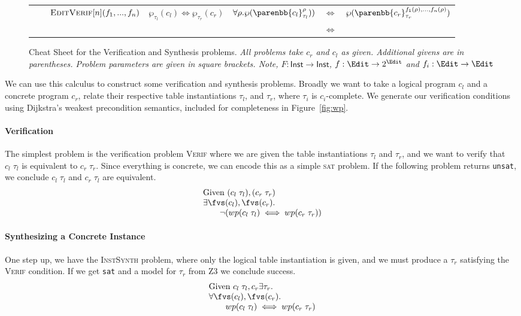 \begin{figure*}
\begin{tabular}{l l c c r >{$ \Leftrightarrow$}c l}
    && $\textsc{EditVerif}[n](f_1,...,f_n)$
    & $\wp_{\tau_l}(c_l) \Leftrightarrow \wp_{\tau_r}(c_r)$
    & $\forall \rho. \wp(\parenbb{c_l}_{\tau_l}^\rho))$ && $\wp(\parenbb{c_r}_{\tau_r}^{f_1(\rho),\ldots,f_n(\rho)})$\\ \addlinespace
    \bottomrule
  \end{tabular}
  \caption{Cheat Sheet for the Verification and Synthesis problems.\textit{ All
      problems take $c_r$ and $c_l$ as given. Additional givens are in
      parentheses.  Problem parameters are given in square brackets. Note,
      $F : \mathsf{Inst} \to \mathsf{Inst}$, $f : \Edit \to 2^\Edit$ and
      $f_i : \Edit \to \Edit$ }}
  \label{fig:problems}
\end{figure*}

We can use this calculus to construct some verification and synthesis
problems. Broadly we want to take a logical program $c_l$ and a concrete program
$c_r$, relate their respective table instantiations $\tau_l$, and $\tau_r$,
where $\tau_i$ is $c_i$-complete.  We generate our verification conditions using
Dijkstra's weakest precondition semantics, included for completeness in
Figure~\ref{fig:wp}.

\paragraph{Verification} The simplest problem is the verification problem
\textsc{Verif} where we are given the table instantiations $\tau_l$ and
$\tau_r$, and we want to verify that $c_l\; \tau_l$ is equivalent to
$c_r\; \tau_r$. Since everything is concrete, we can encode this as a simple
\textsc{sat} problem. If the following problem returns \texttt{unsat}, we
conclude $c_l\; \tau_l$ and $c_r\; \tau_l$ are equivalent.
\[\begin{array}{lcl}
    \text{Given }( c_l\; \tau_l), (c_r\; \tau_r) \\
    \exists \fvs(c_l), \fvs(c_r). \\
    \qquad \neg(wp(c_l\; \tau_l) \iff wp(c_r\; \tau_r))
  \end{array}
\]

\paragraph{Synthesizing a Concrete Instance} One step up, we have the
\textsc{InstSynth} problem, where only the logical table instantiation is given,
and we must produce a $\tau_r$ satisfying the \textsc{Verif} condition. If we
get \texttt{sat} and a model for $\tau_r$ from Z3 we conclude success.
\[\begin{array}{lcl}
    \text{Given } c_l\; \tau_l,c_r
    \exists \tau_r.\\
    \forall \fvs(c_l), \fvs(c_r). \\
    \qquad wp(c_l\; \tau_l) \iff wp(c_r\; \tau_r)
  \end{array}
\]

